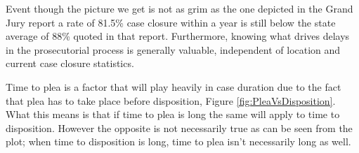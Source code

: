 Event though the picture we get is not as grim as the one depicted in the Grand Jury report a rate of 81.5\% case closure within a year is still below the state average of 88\% quoted in that report. Furthermore, knowing what drives delays in the prosecutorial process is generally valuable, independent of location and current case closure statistics. 

Time to plea is a factor that will play heavily in case duration due to the fact that plea has to take place before disposition, Figure \ref{fig:PleaVsDisposition}. What this means is that if time to plea is long the same will apply to time to disposition. However the opposite is not necessarily true as can be seen from the plot; when time to disposition is long, time to plea isn't necessarily long as well.

